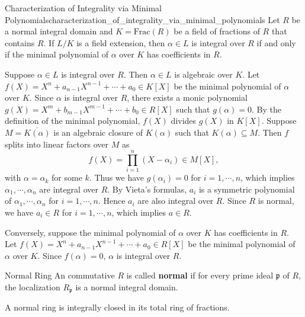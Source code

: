 \begin{proposition}{Characterization of Integrality via Minimal Polynomials}{characterization_of_integrality_via_minimal_polynomials}
    Let $R$ be a normal integral domain and $K=\mathrm{Frac}(R)$ be a field of fractions of $R$ that contains $R$. If $L/K$ is a field extension, then $\alpha\in L$ is integral over $R$ if and only if the minimal polynomial of $\alpha$ over $K$ has coefficients in $R$.
\end{proposition}
\begin{prf}
    Suppose $\alpha\in L$ is integral over $R$. Then $\alpha\in L$ is algebraic over $K$. Let $f(X)=X^n+a_{n-1}X^{n-1}+\cdots+a_0\in K[X]$ be the minimal polynomial of $\alpha$ over $K$. Since $\alpha$ is integral over $R$, there exists a monic polynomial $g(X)=X^m+b_{m-1}X^{m-1}+\cdots+b_0\in R[X]$ such that $g(\alpha)=0$. By the definition of the minimal polynomial, $f(X)$ divides $g(X)$ in $K[X]$. Suppose $M=\overline{K(\alpha)}$ is an algebraic closure of $K(\alpha)$ such that $K(\alpha)\subseteq M$. Then $f$ splits into linear factors over $M$ as 
    \[
    f(X)=\prod_{i=1}^n (X-\alpha_i)\in M[X],
    \]
    with $\alpha=\alpha_k$ for some $k$. Thus we have $g\left(\alpha_i\right)=0$ for $i=1,\cdots,n$, which implies $\alpha_1,\cdots,\alpha_n$ are integral over $R$. By Vieta's formulas, $a_i$ is a symmetric polynomial of $\alpha_1,\cdots,\alpha_n$ for $i=1,\cdots,n$. Hence $a_i$ are also integral over $R$. Since $R$ is normal, we have $a_i\in R$ for $i=1,\cdots,n$, which implies $a \in R$.

    Conversely, suppose the minimal polynomial of $\alpha$ over $K$ has coefficients in $R$. Let $f(X)=X^n+a_{n-1}X^{n-1}+\cdots+a_0\in R[X]$ be the minimal polynomial of $\alpha$ over $K$. Since $f(\alpha)=0$, $\alpha$ is integral over $R$.
\end{prf}

\begin{definition}{Normal Ring}{}
    An commutative $R$ is called \textbf{normal} if for every prime ideal $\mathfrak{p}$ of $R$, the localization $R_\mathfrak{p}$ is a normal integral domain.
\end{definition}
\begin{proposition}{}{}
A normal ring is integrally closed in its total ring of fractions.
\end{proposition}


